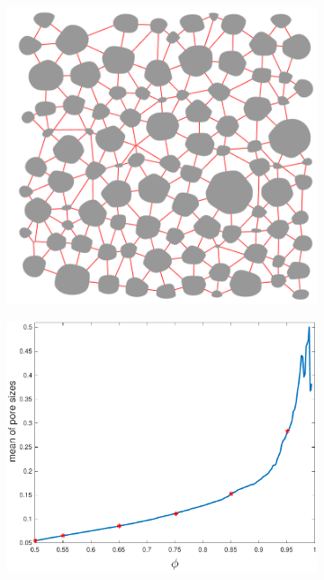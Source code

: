 \documentclass[11pt]{article}
\begin{document}
\begin{figure}[htp]
\begin{subfigure}[b]{0.33\textwidth}
  \includegraphics*[height=0.8\linewidth]{figs/triangulation_100b100.pdf}
\caption{}
\end{subfigure}
\begin{subfigure}[b]{0.33\textwidth}
  \includegraphics*[height = 0.8\linewidth]{figs/gap_mean}
\caption{}
\end{subfigure}
\begin{subfigure}[b]{0.33\textwidth}

\end{subfigure}
\end{figure}
\end{document}
